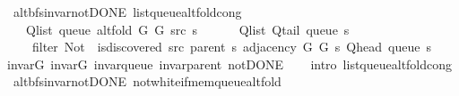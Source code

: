 \begin{isabellebody}
\endisatagproof
{\isafoldproof}%
%
\isadelimproof
\isanewline
%
\endisadelimproof
\isanewline
{}\isamarkupfalse%
\ {\isacharparenleft}{\kern0pt}\ alt{\isacharunderscore}{\kern0pt}bfs{\isacharunderscore}{\kern0pt}invar{\isacharunderscore}{\kern0pt}not{\isacharunderscore}{\kern0pt}DONE{\isacharparenright}{\kern0pt}\ list{\isacharunderscore}{\kern0pt}queue{\isacharunderscore}{\kern0pt}alt{\isacharunderscore}{\kern0pt}fold{\isacharunderscore}{\kern0pt}cong{\isacharcolon}{\kern0pt}\isanewline
\ \ \isanewline
\ \ \ \ {\isachardoublequoteopen}Q{\isacharunderscore}{\kern0pt}list\ {\isacharparenleft}{\kern0pt}queue\ {\isacharparenleft}{\kern0pt}alt{\isacharunderscore}{\kern0pt}fold\ G{}\ G{}\ src\ s{\isacharparenright}{\kern0pt}{\isacharparenright}{\kern0pt}\ {\isacharequal}{\kern0pt}\isanewline
\ \ \ \ \ Q{\isacharunderscore}{\kern0pt}list\ {\isacharparenleft}{\kern0pt}Q{\isacharunderscore}{\kern0pt}tail\ {\isacharparenleft}{\kern0pt}queue\ s{\isacharparenright}{\kern0pt}{\isacharparenright}{\kern0pt}\ {\isacharat}{\kern0pt}\isanewline
\ \ \ \ \ filter\ {\isacharparenleft}{\kern0pt}Not\ {\isasymcirc}\ is{\isacharunderscore}{\kern0pt}discovered\ src\ {\isacharparenleft}{\kern0pt}parent\ s{\isacharparenright}{\kern0pt}{\isacharparenright}{\kern0pt}\ {\isacharparenleft}{\kern0pt}adjacency\ G{}\ G{}\ s\ {\isacharparenleft}{\kern0pt}Q{\isacharunderscore}{\kern0pt}head\ {\isacharparenleft}{\kern0pt}queue\ s{\isacharparenright}{\kern0pt}{\isacharparenright}{\kern0pt}{\isacharparenright}{\kern0pt}{\isachardoublequoteclose}\isanewline
%
\isadelimproof
\ \ %
\endisadelimproof
%
\isatagproof
{}\isamarkupfalse%
\ invar{\isacharunderscore}{\kern0pt}G{}\ invar{\isacharunderscore}{\kern0pt}G{}\ invar{\isacharunderscore}{\kern0pt}queue\ invar{\isacharunderscore}{\kern0pt}parent\ not{\isacharunderscore}{\kern0pt}DONE\isanewline
\ \ \isamarkupfalse%
\ {\isacharparenleft}{\kern0pt}intro\ list{\isacharunderscore}{\kern0pt}queue{\isacharunderscore}{\kern0pt}alt{\isacharunderscore}{\kern0pt}fold{\isacharunderscore}{\kern0pt}cong{\isacharparenright}{\kern0pt}%
\endisatagproof
{\isafoldproof}%
%
\isadelimproof
\isanewline
%
\endisadelimproof
%
\isadeliminvisible
\isanewline
%
\endisadeliminvisible
%
\isataginvisible
{}\isamarkupfalse%
\ {\isacharparenleft}{\kern0pt}\ alt{\isacharunderscore}{\kern0pt}bfs{\isacharunderscore}{\kern0pt}invar{\isacharunderscore}{\kern0pt}not{\isacharunderscore}{\kern0pt}DONE{\isacharparenright}{\kern0pt}\ not{\isacharunderscore}{\kern0pt}white{\isacharunderscore}{\kern0pt}if{\isacharunderscore}{\kern0pt}mem{\isacharunderscore}{\kern0pt}queue{\isacharunderscore}{\kern0pt}alt{\isacharunderscore}{\kern0pt}fold{\isacharcolon}{\kern0pt}\isanewline

\end{isabellebody}
